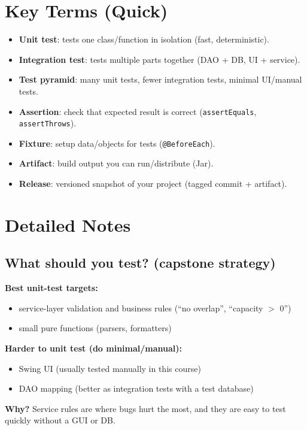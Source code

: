 \documentclass[11pt]{article}
\begin{document}
\section{Key Terms (Quick)}
\begin{itemize}
  \item \textbf{Unit test}: tests one class/function in isolation (fast, deterministic).
  \item \textbf{Integration test}: tests multiple parts together (DAO + DB, UI + service).
  \item \textbf{Test pyramid}: many unit tests, fewer integration tests, minimal UI/manual tests.
  \item \textbf{Assertion}: check that expected result is correct (\texttt{assertEquals}, \texttt{assertThrows}).
  \item \textbf{Fixture}: setup data/objects for tests (\texttt{@BeforeEach}).
  \item \textbf{Artifact}: build output you can run/distribute (Jar).
  \item \textbf{Release}: versioned snapshot of your project (tagged commit + artifact).
\end{itemize}

\section{Detailed Notes}
\subsection{What should you test? (capstone strategy)}
\textbf{Best unit-test targets:}
\begin{itemize}
  \item service-layer validation and business rules (``no overlap'', ``capacity $>$ 0'')
  \item small pure functions (parsers, formatters)
\end{itemize}

\textbf{Harder to unit test (do minimal/manual):}
\begin{itemize}
  \item Swing UI (usually tested manually in this course)
  \item DAO mapping (better as integration tests with a test database)
\end{itemize}

\textbf{Why?} Service rules are where bugs hurt the most, and they are easy to test quickly without a GUI or DB.
\end{document}
